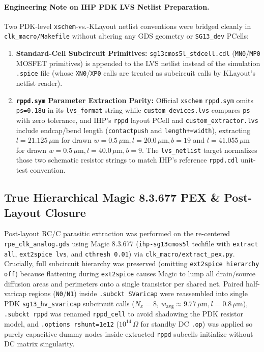 \documentclass[10pt,a4paper]{article}
\begin{document}
\paragraph{Engineering Note on IHP PDK LVS Netlist Preparation.}
Two PDK-level \texttt{xschem}-vs.-KLayout netlist conventions were bridged cleanly in \texttt{clk\_macro/Makefile} without altering any GDS geometry or \texttt{SG13\_dev} PCells:
\begin{enumerate}
  \item \textbf{Standard-Cell Subcircuit Primitives:} \texttt{sg13cmos5l\_stdcell.cdl} (\texttt{MN0}/\texttt{MP0} MOSFET primitives) is appended to the LVS netlist instead of the simulation \texttt{.spice} file (whose \texttt{XN0}/\texttt{XP0} calls are treated as subcircuit calls by KLayout's netlist reader).
  \item \textbf{\texttt{rppd.sym} Parameter Extraction Parity:} Official \texttt{xschem} \texttt{rppd.sym} omits \texttt{ps=0.18u} in its \texttt{lvs\_format} string while \texttt{custom\_devices.lvs} compares \texttt{ps} with zero tolerance, and IHP's \texttt{rppd} layout PCell and \texttt{custom\_extractor.lvs} include endcap/bend length (\texttt{contactpush} and \texttt{length+=width}), extracting $l=21.125\,\mu\text{m}$ for drawn $w=0.5\,\mu\text{m}, l=20.0\,\mu\text{m}, b=19$ and $l=41.055\,\mu\text{m}$ for drawn $w=0.5\,\mu\text{m}, l=40.0\,\mu\text{m}, b=9$. The \texttt{lvs\_netlist} target normalizes those two schematic resistor strings to match IHP's reference \texttt{rppd.cdl} unit-test convention.
\end{enumerate}

\subsection{True Hierarchical Magic 8.3.677 PEX \& Post-Layout Closure}
\label{sec:pex}
Post-layout RC/C parasitic extraction was performed on the re-centered \texttt{rpe\_clk\_analog.gds} using Magic 8.3.677 (\texttt{ihp-sg13cmos5l} techfile with \texttt{extract all}, \texttt{ext2spice lvs}, and \texttt{cthresh 0.01}) via \texttt{clk\_macro/extract\_pex.py}. Crucially, full subcircuit hierarchy was preserved (omitting \texttt{ext2spice hierarchy off}) because flattening during \texttt{ext2spice} causes Magic to lump all drain/source diffusion areas and perimeters onto a single transistor per shared net. Paired half-varicap regions (\texttt{N0}/\texttt{N1}) inside \texttt{.subckt SVaricap} were reassembled into single PDK \texttt{sg13\_hv\_svaricap} subcircuit calls ($N_x = 8$, $w_{\text{avg}} \approx 9.77\,\mu\text{m}, l = 0.8\,\mu\text{m}$), \texttt{.subckt rppd} was renamed \texttt{rppd\_cell} to avoid shadowing the PDK resistor model, and \texttt{.options rshunt=1e12} ($10^{14}\,\Omega$ for standby DC \texttt{.op}) was applied so purely capacitive dummy nodes inside extracted \texttt{rppd} subcells initialize without DC matrix singularity.
\end{document}
